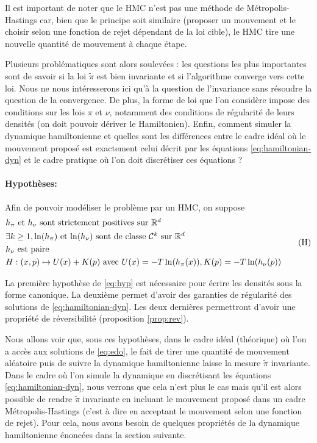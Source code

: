 \documentclass[10pt,a4paper]{article}
\begin{document}
Il est important de noter que le HMC n'est pas une méthode de Métropolis-Hastings car, bien que le principe soit similaire (proposer un mouvement et le choisir selon une fonction de rejet dépendant de la loi cible), le HMC tire une nouvelle quantité de mouvement à chaque étape.

Plusieurs problématiques sont alors soulevées : les questions les plus importantes sont de savoir si la loi $\widetilde{\pi}$ est bien invariante et si l'algorithme converge vers cette loi. Nous ne nous intéresserons ici qu'à la question de l'invariance sans résoudre la question de la convergence. De plus, la forme de loi que l'on considère impose des conditions sur les lois $\pi$ et $\nu$, notamment des conditions de régularité de leurs densités (on doit pouvoir dériver le Hamiltonien). Enfin, comment simuler la dynamique hamiltonienne et quelles sont les différences entre le cadre idéal où le mouvement proposé est exactement celui décrit par les équations \eqref{eq:hamiltonian-dyn} et le cadre pratique où l'on doit discrétiser ces équations ?

\paragraph{Hypothèses:}
Afin de pouvoir modéliser le problème par un HMC, on suppose
\begin{equation}\label{eq:hyp}
	\begin{aligned}
		&\mbox{$h_\pi$ et $h_\nu$ sont strictement positives sur $\mathbb{R}^d$} \\
		&\mbox{$\exists k \geq 1, \ln(h_\pi)$ et $\ln(h_\nu)$ sont de classe $\mathcal{C}^k$ sur $\mathbb{R}^d$}\\
		&\mbox{$h_\nu$ est paire} \\
                & H : (x,p) \mapsto U(x) + K(p) \text{ avec } U(x) = - T \ln(h_\pi(x)), K(p) = -T \ln(h_\nu(p))
	\end{aligned}
	\tag{H}
\end{equation}

\begin{Rque}
	La première hypothèse de \eqref{eq:hyp} est nécessaire pour écrire les densités sous la forme canonique. La deuxième permet d'avoir des garanties de régularité des solutions de \eqref{eq:hamiltonian-dyn}. Les deux dernières permettront d'avoir une propriété de réversibilité (proposition \ref{prop:rev}).
\end{Rque}

Nous allons voir que, sous ces hypothèses, dans le cadre idéal (théorique) où l'on a accès aux solutions de \eqref{eq:edo}, le fait de tirer une quantité de mouvement aléatoire puis de suivre la dynamique hamiltonienne laisse la mesure $\tilde{\pi}$ invariante. Dans le cadre où l'on simule la dynamique en discrétisant les équations \eqref{eq:hamiltonian-dyn}, nous verrons que cela n'est plus le cas mais qu'il est alors possible de rendre $\tilde{\pi}$ invariante en incluant le mouvement proposé dans un cadre Métropolis-Hastings (c'est à dire en acceptant le mouvement selon une fonction de rejet). Pour cela, nous avons besoin de quelques propriétés de la dynamique hamiltonienne énoncées dans la section suivante.
\end{document}
